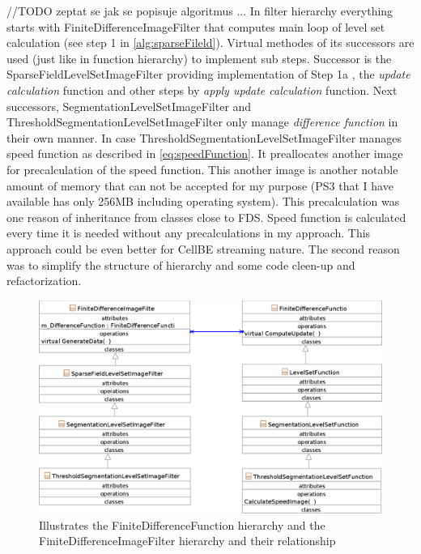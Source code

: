 //TODO zeptat se jak se popisuje algoritmus ...
In filter hierarchy everything starts with FiniteDifferenceImageFilter that computes main loop of level set calculation (see step 1 in \ref{alg:sparseFileld}). Virtual methodes of its successors are used (just like in function hierarchy) to implement sub steps. Successor is the SparseFieldLevelSetImageFilter providing implementation of Step 1a , the \emph{update calculation} function and other steps by \emph{apply update calculation} function. Next successors, SegmentationLevelSetImageFilter and ThresholdSegmentationLevelSetImageFilter only manage \emph{difference function} in their own manner. In case ThresholdSegmentationLevelSetImageFilter manages speed function as described in \ref{eq:speedFunction}. It preallocates another image for precalculation of the speed function. This another image is another notable amount of memory that can not be accepted for my purpose (PS3 that I have available has only 256MB including operating system). This precalculation was one reason of inheritance from classes close to FDS. Speed function is calculated every time it is needed without any precalculations in my approach. This approach could be even better for CellBE streaming nature. The second reason was to simplify the structure of hierarchy and some code cleen-up and refactorization.

\begin{figure}
    \centering
    \includegraphics[width=15cm]{data/originalHierarchy}
    \caption[Original ITK thresholding level set filter class hierarchy]{Illustrates the FiniteDifferenceFunction hierarchy and the FiniteDifferenceImageFilter hierarchy and their relationship}
    \label{fg:originalHierarchy}
\end{figure}

